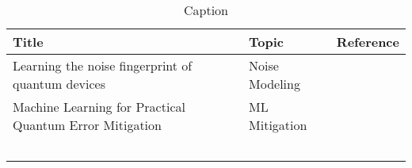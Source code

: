 
\begin{table}
    \centering
    \begin{tabular}{llc}
        \hline
        Title & Topic & Reference\\
         \hline\hline
         Learning the noise fingerprint of quantum devices & Noise Modeling & \cite{martina_learning_2022} \\
         Machine Learning for Practical Quantum Error Mitigation & ML Mitigation & \cite{liao_machine_2024} \\
         &  & \\
         &  & \\
         &  & \\
         &  & \\
         &  & \\
         \hline
    \end{tabular}
    \caption{Caption}
    \label{tab:works_overview}
\end{table}